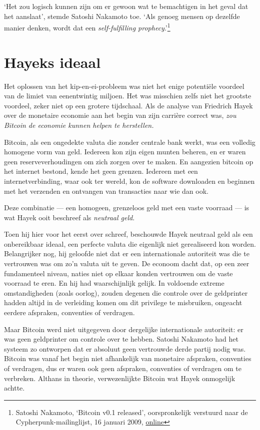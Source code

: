 \documentclass[smalldemyvopaper,11pt,twoside,onecolumn,openright,extrafontsizes,hidelinks]{memoir}
\begin{document}
`Het zou logisch kunnen zijn om er gewoon wat te bemachtigen in het
geval dat het aanslaat', stemde Satoshi Nakamoto toe. `Als genoeg mensen
op dezelfde manier denken, wordt dat een \emph{self-fulfilling
prophecy}.'\footnote{Satoshi Nakamoto, `Bitcoin v0.1 released',
  oorspronkelijk verstuurd naar de Cypherpunk-mailinglijst, 16 januari
  2009,
  \href{https://www.metzdowd.com/pipermail/cryptography/2009-January/015014.html}{online}}

\section{Hayeks ideaal}\label{hayeks-ideaal}

Het oplossen van het kip-en-ei-probleem was niet het enige potentiële
voordeel van de limiet van eenentwintig miljoen. Het was misschien zelfs
niet het grootste voordeel, zeker niet op een grotere tijdschaal. Als de
analyse van Friedrich Hayek over de monetaire economie aan het begin van
zijn carrière correct was, \emph{zou Bitcoin de economie kunnen helpen
te herstellen.}

Bitcoin, als een ongedekte valuta die zonder centrale bank werkt, was
een volledig homogene vorm van geld. Iedereen kon zijn eigen munten
beheren, en er waren geen reserveverhoudingen om zich zorgen over te
maken. En aangezien bitcoin op het internet bestond, kende het geen
grenzen. Iedereen met een internetverbinding, waar ook ter wereld, kon
de software downloaden en beginnen met het verzenden en ontvangen van
transacties naar wie dan ook.

Deze combinatie --- een homogeen, grenzeloos geld met een vaste voorraad
--- is wat Hayek ooit beschreef als \emph{neutraal geld}.

Toen hij hier voor het eerst over schreef, beschouwde Hayek neutraal
geld als een onbereikbaar ideaal, een perfecte valuta die eigenlijk niet
gerealiseerd kon worden. Belangrijker nog, hij geloofde niet dat er een
internationale autoriteit was die te vertrouwen was om zo'n valuta uit
te geven. De econoom dacht dat, op een zeer fundamenteel niveau, naties
niet op elkaar konden vertrouwen om de vaste voorraad te eren. En hij
had waarschijnlijk gelijk. In voldoende extreme omstandigheden (zoals
oorlog), zouden degenen die controle over de geldprinter hadden altijd
in de verleiding komen om dit privilege te misbruiken, ongeacht eerdere
afspraken, conventies of verdragen.

Maar Bitcoin werd niet uitgegeven door dergelijke internationale
autoriteit: er was geen geldprinter om controle over te hebben. Satoshi
Nakamoto had het systeem zo ontworpen dat er absoluut geen vertrouwde
derde partij nodig was. Bitcoin was vanaf het begin niet afhankelijk van
monetaire afspraken, conventies of verdragen, dus er waren ook geen
afspraken, conventies of verdragen om te verbreken. Althans in theorie,
verwezenlijkte Bitcoin wat Hayek onmogelijk achtte.
\end{document}
